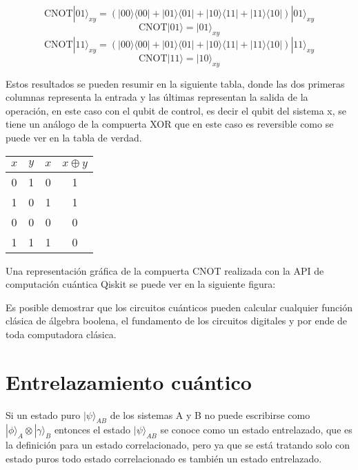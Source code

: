 \documentclass[a4paper]{article}
\begin{document}
\begin{equation}
\text{CNOT}|01\rangle_{xy}=(|00\rangle\langle 00|+|01\rangle\langle 01|+|10\rangle\langle 11|+|11\rangle\langle 10|)|01\rangle_{xy}
\end{equation}
\begin{equation*}
\text{CNOT}|01\rangle=|01\rangle_{xy}
\end{equation*}
\begin{equation}
\text{CNOT}|11\rangle_{xy}=(|00\rangle\langle 00|+|01\rangle\langle 01|+|10\rangle\langle 11|+|11\rangle\langle 10|)|11\rangle_{xy}
\end{equation}
\begin{equation*}
\text{CNOT}|11\rangle=|10\rangle_{xy}
\end{equation*}

Estos resultados se pueden resumir en la siguiente tabla, donde las dos primeras columnas representa la entrada y las últimas representan la salida de la operación, en este caso con el qubit de control, es decir el qubit del sistema x, se tiene un análogo de la compuerta XOR que en este caso es reversible como se puede ver en la tabla de verdad.
\begin{center}
\begin{tabular}{ |c|c|c|c| } 
 \hline
 $x$ & $y$ & $x$ & $x\oplus y$ \\ \hline
 0   & 1   &  0 &    1\\
 1   & 0   &  1 &    1\\
 0   & 0   &  0 &    0\\
 1   & 1   &  1 &    0\\ 
 \hline
\end{tabular}
\end{center}
Una representación gráfica de la compuerta CNOT realizada con la API de computación cuántica Qiskit se puede ver en la siguiente figura:

Es posible demostrar que los circuitos cuánticos pueden calcular cualquier función clásica de álgebra boolena, el fundamento de los circuitos digitales y por ende de toda computadora clásica.

\section{Entrelazamiento cuántico}
Si un estado  puro $|\psi\rangle_{AB}$ de los sistemas A y B no puede escribirse como $|\phi\rangle_A\otimes |\gamma\rangle_B$ entonces el estado $|\psi\rangle_{AB}$ se conoce como un estado entrelazado, que es la definición para un estado correlacionado, pero ya que se está tratando solo con estado puros todo estado correlacionado es también un estado entrelazado.
\end{document}
